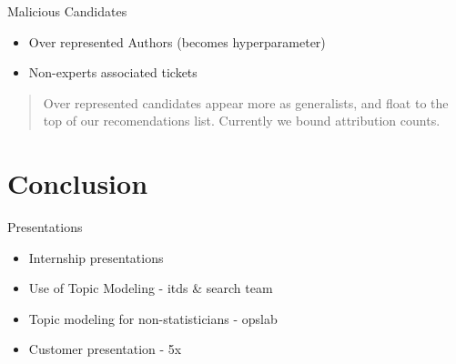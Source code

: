 \documentclass[10pt]{beamer}
\begin{document}
\begin{frame}{Malicious Candidates}
  \begin{itemize}
  \item Over represented Authors (becomes hyperparameter)
  \item Non-experts associated tickets
  \end{itemize}

  \begin{quote}
    Over represented candidates appear more as generalists, and float to the top of our recomendations list. Currently we bound attribution counts.
  \end{quote}
\end{frame}

\section{Conclusion}

\begin{frame}{Presentations}
  \begin{itemize}
  \item Internship presentations
  \item Use of Topic Modeling - itds \& search team
  \item Topic modeling for non-statisticians - opslab
  \item Customer presentation - 5x
  \end{itemize}
\end{frame}
\end{document}
